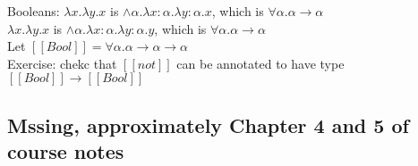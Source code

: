 \documentclass[11pt]{article}
\begin{document}
Booleans: $\lambda x.\lambda y.x$ is $\land \alpha. \lambda x:\alpha.\lambda y: \alpha.x$, which is $\forall \alpha.\alpha \rightarrow \alpha$ \\

$\lambda x.\lambda y.x$ is $\land \alpha. \lambda x:\alpha.\lambda y: \alpha.y$, which is $\forall \alpha.\alpha \rightarrow \alpha$ \\

Let $[[Bool]] = \forall \alpha.\alpha \rightarrow \alpha \rightarrow \alpha$ \\

Exercise: chekc that $[[not]]$ can be annotated to have type $[[Bool]] \rightarrow [[Bool]]$

\subsection{Mssing, approximately Chapter 4 and 5 of course notes}
\end{document}
